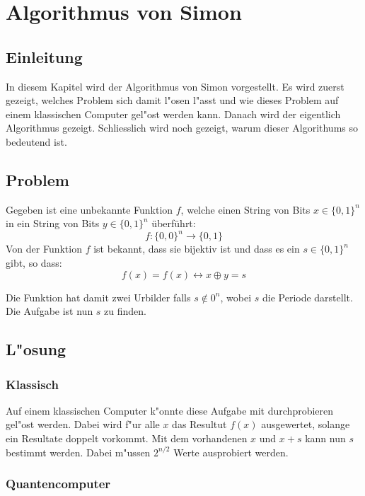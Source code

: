\chapter{Algorithmus von Simon\label{chapter:simon}} 
\begin{refsection} 

\section{Einleitung} 

In diesem Kapitel wird der Algorithmus von Simon vorgestellt.  Es wird zuerst
gezeigt, welches Problem sich damit l"osen l"asst und wie dieses Problem auf
einem klassischen Computer gel"ost werden kann. Danach wird der eigentlich
Algorithmus gezeigt. Schliesslich wird noch gezeigt, warum dieser Algorithums so
bedeutend ist.

\section{Problem} 

Gegeben ist eine unbekannte Funktion $f$, welche einen String
von Bits $x\in\{0,1\}^n$ in ein String von Bits $y\in\{0,1\}^n$ \"uberf\"uhrt:
\[
    f\colon\{0,0\}^n\to\{0,1\} 
\]
Von der Funktion $f$ ist bekannt, dass sie bijektiv ist und dass es ein
$s\in\{0,1\}^n$ gibt, so dass: \[ f(x) = f(x) \leftrightarrow x \oplus y = s \]

Die Funktion hat damit zwei Urbilder falls $s \notin 0^n$, wobei $s$ die
Periode darstellt. Die Aufgabe ist nun $s$ zu finden.

\section{L"osung}

\subsection{Klassisch}

Auf einem klassischen Computer k"onnte diese Aufgabe mit durchprobieren gel"ost
werden. Dabei wird f"ur alle $x$ das Resultut $f(x)$ ausgewertet, solange ein
Resultate doppelt vorkommt. Mit dem vorhandenen $x$ und $x + s$ kann nun $s$
bestimmt werden. Dabei m"ussen $2^{n/2}$ Werte ausprobiert werden.

\subsection{Quantencomputer}


\end{refsection}
